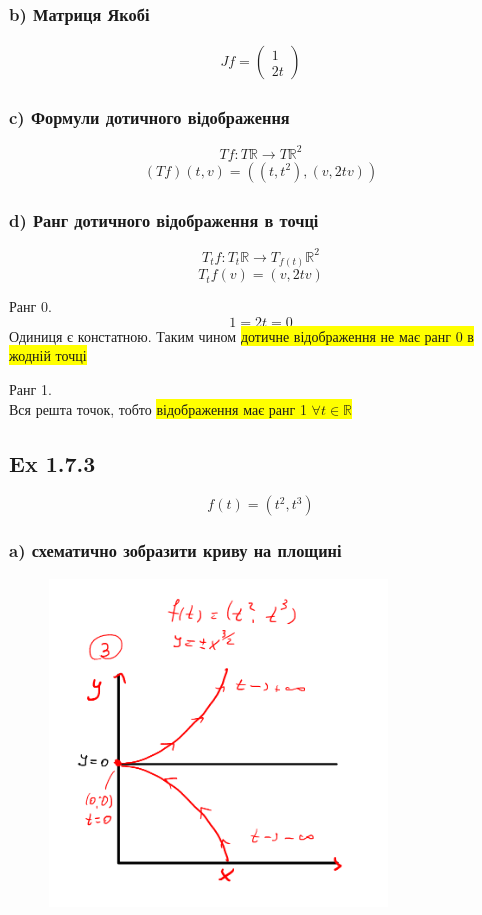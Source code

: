 \documentclass[10pt, a4paper]{article} %
\newcommand{\R}{\mathbb{R}}
\begin{document}
\subsubsection*{b) Матриця Якобі}
\begin{align*}
    Jf = \begin{pmatrix}
        1 \\ 2t
    \end{pmatrix}
\end{align*}

\subsubsection*{c) Формули дотичного відображення}
\[Tf : T\R \to T\R^2\]
\begin{align*}
    (Tf)(t, v) = \left((t, t^2), (v , 2tv)\right)
\end{align*}

\subsubsection*{d) Ранг дотичного відображення в точці}
\[T_{t}f: T_{t}\R \to T_{f(t)}\R^2\]
\[T_{t}f(v) = (v , 2tv)\]

Ранг 0.
\[1 = 2t = 0\]
Одиниця є констатною.
Таким чином \colorbox{yellow}{дотичне відображення не має ранг 0 в жодній точці}

Ранг 1.\\
Вся решта точок, тобто \colorbox{yellow}{відображення має ранг 1 $\forall t \in \R$}


\subsection*{Ex 1.7.3}
\[f(t) = (t^2, t^3)\]

\subsubsection*{a) схематично зобразити криву на площині}
\begin{figure}[h]
    \includegraphics[width=0.8\textwidth]{1.7.3.png}
    \centering
\end{figure}
\end{document}
